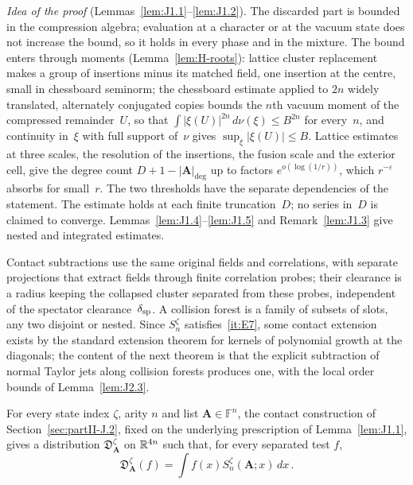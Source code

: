 \emph{Idea of the proof} (Lemmas~\ref{lem:J1.1}--\ref{lem:J1.2}). The discarded part is bounded in the compression algebra; evaluation at a character or at the vacuum state does not increase the bound, so it holds in every phase and in the mixture. The bound enters through moments (Lemma~\ref{lem:H-roots}): lattice cluster replacement makes a group of insertions minus its matched field, one insertion at the centre, small in chessboard seminorm; the chessboard estimate applied to $2n$ widely translated, alternately conjugated copies bounds the $n$th vacuum moment of the compressed remainder~$U$, so that $\int|\xi(U)|^{2n}\,d\nu(\xi)\le B^{2n}$ for every~$n$, and continuity in~$\xi$ with full support of~$\nu$ gives $\sup_\xi|\xi(U)|\le B$. Lattice estimates at three scales, the resolution of the insertions, the fusion scale and the exterior cell, give the degree count $D+1-|\boldsymbol A|_{\deg}$ up to factors $e^{o(\log(1/r))}$, which $r^{-\varepsilon}$ absorbs for small~$r$. The two thresholds have the separate dependencies of the statement. The estimate holds at each finite truncation~$D$; no series in~$D$ is claimed to converge. Lemmas~\ref{lem:J1.4}--\ref{lem:J1.5} and Remark~\ref{lem:J1.3} give nested and integrated estimates.

Contact subtractions use the same original fields and correlations, with separate projections that extract fields through finite correlation probes; their clearance is a radius keeping the collapsed cluster separated from these probes, independent of the spectator clearance~$\delta_{\rm sp}$. A collision forest is a family of subsets of slots, any two disjoint or nested. Since $S_n^\zeta$ satisfies~\ref{it:E7}, some contact extension exists by the standard extension theorem for kernels of polynomial growth at the diagonals; the content of the next theorem is that the explicit subtraction of normal Taylor jets along collision forests produces one, with the local order bounds of Lemma~\ref{lem:J2.3}.

\begin{theorem}\label{prop:CT}
For every state index $\zeta$, arity $n$ and list $\boldsymbol A\in\mathbb F^n$, the contact construction of Section~\ref{sec:partII-J.2}, fixed on the underlying prescription of Lemma~\ref{lem:J1.1}, gives a distribution $\mathfrak D_{\boldsymbol A}^\zeta$ on $\mathbb{R}^{4n}$ such that, for every separated test $f$,
\begin{equation*}
\mathfrak D_{\boldsymbol A}^\zeta(f)=\int f(x)S_n^\zeta(\boldsymbol A;x)\,dx\,.
\end{equation*}
\end{theorem}

